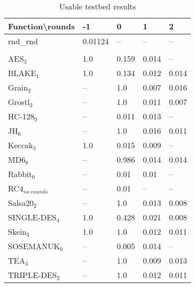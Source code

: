\documentclass[twoside,a4paper]{article}
\begin{document}
\newcommand{\fd}{\cellcolor{red!13}}
\newcommand{\fn}{\cellcolor{green!13}}

\begin{table}[H]
\centering
\label{res_usable}
\begin{tabular}{l|l l l l}
Function\textbackslash{}rounds & -1 & 0 & 1 & 2\\ \hline
rnd\_rnd         & \fn{}0.01124 & --       & --         & --        \\\\
AES$_{3}$        & \fd{}1.0   & \fd{}0.159 & \fn{}0.014 & \fn{}--   \\
BLAKE$_{1}$      & \fd{}1.0   & \fd{}0.134 & \fn{}0.012 & \fn{}0.014\\
Grain$_{2}$      & \fd{}--    & \fd{}1.0   & \fn{}0.007 & \fn{}0.016\\
Grostl$_{2}$     & \fd{}--    & \fd{}1.0   & \fn{}0.011 & \fn{}0.007\\
HC-128$_{0}$     & \fd{}--    & \fn{}0.011 & \fn{}0.013 & \fn{}--   \\
JH$_{6}$         & \fd{}--    & \fd{}1.0   & \fn{}0.016 & \fn{}0.011\\
Keccak$_{3}$     & \fd{}1.0   & \fn{}0.015 & \fn{}0.009 & \fn{}--   \\
MD6$_{8}$        & \fd{}--    & \fd{}0.986 & \fn{}0.014 & \fn{}0.014\\
Rabbit$_{0}$     & \fd{}--    & \fn{}0.01  & \fn{}0.01  & \fn{}--   \\
RC4$_{no~rounds}$& --         & \fn{}0.01  & --         & --        \\
Salsa20$_{2}$    & \fd{}--    & \fd{}1.0   & \fn{}0.013 & \fn{}0.008\\
SINGLE-DES$_{4}$ & \fd{}1.0   & \fd{}0.428 & \fn{}0.021 & \fn{}0.008\\
Skein$_{3}$      & \fd{}1.0   & \fd{}1.0   & \fn{}0.012 & \fn{}0.011\\
SOSEMANUK$_{0}$  & \fd{}--    & \fn{}0.005 & \fn{}0.014 & \fn{}--   \\
TEA$_{3}$        & \fd{}--    & \fd{}1.0   & \fn{}0.009 & \fn{}0.013\\
TRIPLE-DES$_{2}$ & \fd{}--    & \fd{}1.0   & \fn{}0.012 & \fn{}0.011
\end{tabular}
\caption{Usable testbed results}
\end{table}
\end{document}
